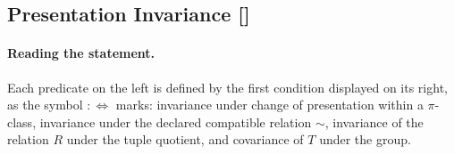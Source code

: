 \subsection{Presentation Invariance [\texorpdfstring{}{F29}]}\label{sec:status-records-coherence:presentation-invariance}

\paragraph{Reading the statement.}
Each predicate on the left is defined by the first condition displayed on
its right, as the symbol \(:\Longleftrightarrow\) marks: invariance under change of presentation within a
\(\pi\)-class, invariance under the declared compatible relation \(\sim\),
invariance of the relation \(R\) under the tuple quotient, and
covariance of \(T\) under the group.

